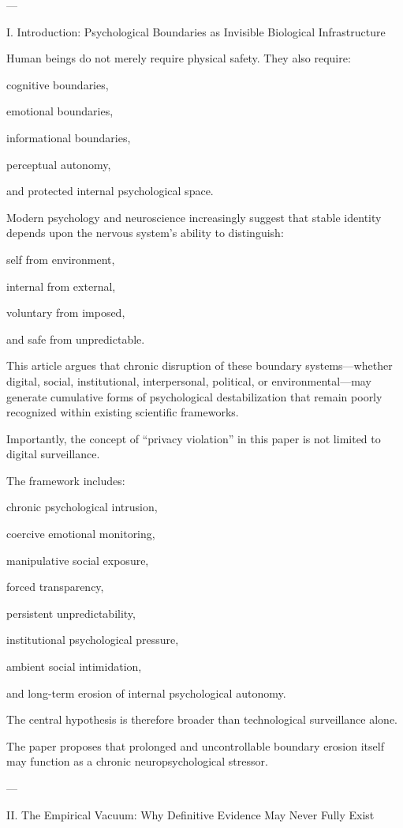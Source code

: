 ---

I. Introduction: Psychological Boundaries as Invisible Biological Infrastructure

Human beings do not merely require physical safety. They also require:

cognitive boundaries,

emotional boundaries,

informational boundaries,

perceptual autonomy,

and protected internal psychological space.


Modern psychology and neuroscience increasingly suggest that stable identity depends upon the nervous system’s ability to distinguish:

self from environment,

internal from external,

voluntary from imposed,

and safe from unpredictable.


This article argues that chronic disruption of these boundary systems—whether digital, social, institutional, interpersonal, political, or environmental—may generate cumulative forms of psychological destabilization that remain poorly recognized within existing scientific frameworks.

Importantly, the concept of “privacy violation” in this paper is not limited to digital surveillance.

The framework includes:

chronic psychological intrusion,

coercive emotional monitoring,

manipulative social exposure,

forced transparency,

persistent unpredictability,

institutional psychological pressure,

ambient social intimidation,

and long-term erosion of internal psychological autonomy.


The central hypothesis is therefore broader than technological surveillance alone.

The paper proposes that prolonged and uncontrollable boundary erosion itself may function as a chronic neuropsychological stressor.


---

II. The Empirical Vacuum: Why Definitive Evidence May Never Fully Exist

